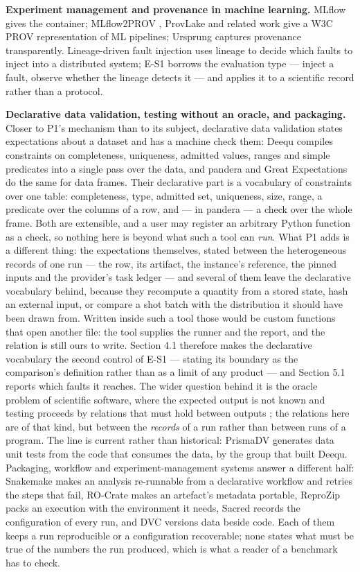 \documentclass[acmsmall,screen,review]{acmart}
\begin{document}
\textbf{Experiment management and provenance in machine learning.} MLflow \cite{ref11} gives the container; MLflow2PROV \cite{ref12}, ProvLake and related work \cite{ref13} give a W3C PROV representation of ML pipelines; Ursprung \cite{ref14} captures provenance transparently. Lineage-driven fault injection \cite{ref15} uses lineage to decide which faults to inject into a distributed system; E-S1 borrows the evaluation type --- inject a fault, observe whether the lineage detects it --- and applies it to a scientific record rather than a protocol.


\textbf{Declarative data validation, testing without an oracle, and packaging.} Closer to P1's mechanism than to its subject, declarative data validation states expectations about a dataset and has a machine check them: Deequ \cite{ref16} compiles constraints on completeness, uniqueness, admitted values, ranges and simple predicates into a single pass over the data, and pandera \cite{ref17} and Great Expectations \cite{ref18} do the same for data frames. Their declarative part is a vocabulary of constraints over one table: completeness, type, admitted set, uniqueness, size, range, a predicate over the columns of a row, and --- in pandera --- a check over the whole frame. Both are extensible, and a user may register an arbitrary Python function as a check, so nothing here is beyond what such a tool can \textit{run}. What P1 adds is a different thing: the expectations themselves, stated between the heterogeneous records of one run --- the row, its artifact, the instance's reference, the pinned inputs and the provider's task ledger --- and several of them leave the declarative vocabulary behind, because they recompute a quantity from a stored state, hash an external input, or compare a shot batch with the distribution it should have been drawn from. Written inside such a tool those would be custom functions that open another file: the tool supplies the runner and the report, and the relation is still ours to write. Section 4.1 therefore makes the declarative vocabulary the second control of E-S1 --- stating its boundary as the comparison's definition rather than as a limit of any product --- and Section 5.1 reports which faults it reaches. The wider question behind it is the oracle problem of scientific software, where the expected output is not known and testing proceeds by relations that must hold between outputs \cite{ref19}; the relations here are of that kind, but between the \textit{records} of a run rather than between runs of a program. The line is current rather than historical: PrismaDV \cite{ref20} generates data unit tests from the code that consumes the data, by the group that built Deequ. Packaging, workflow and experiment-management systems answer a different half: Snakemake \cite{ref21} makes an analysis re-runnable from a declarative workflow and retries the steps that fail, RO-Crate \cite{ref22} makes an artefact's metadata portable, ReproZip \cite{ref23} packs an execution with the environment it needs, Sacred \cite{ref24} records the configuration of every run, and DVC \cite{ref25} versions data beside code. Each of them keeps a run reproducible or a configuration recoverable; none states what must be true of the numbers the run produced, which is what a reader of a benchmark has to check.
\end{document}
